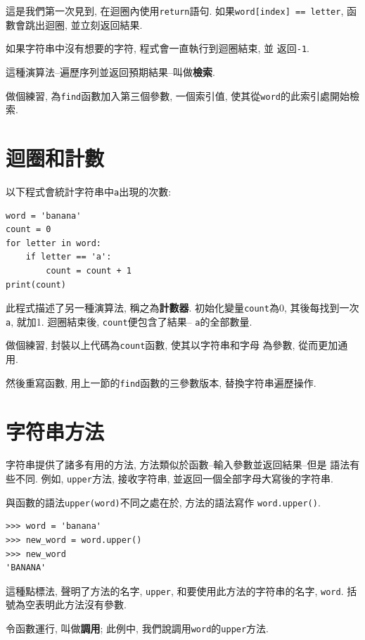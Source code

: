 \documentclass[10pt]{book}
\begin{document}
這是我們第一次見到, 在迴圈內使用{\tt return}語句. 
如果{\tt word[index] == letter}, 函數會跳出迴圈, 並立刻返回結果. 

如果字符串中沒有想要的字符, 程式會一直執行到迴圈結束, 並
返回{\tt -1}.

這種演算法--遍歷序列並返回預期結果--叫做{\bf 檢索}. 

做個練習, 為{\tt find}函數加入第三個參數, 一個索引值, 
使其從{\tt word}的此索引處開始檢索.


\section{迴圈和計數}
\label{counter}
以下程式會統計字符串中{\tt a}出現的次數:

\begin{verbatim}
word = 'banana'
count = 0
for letter in word:
    if letter == 'a':
        count = count + 1
print(count)
\end{verbatim}
%
此程式描述了另一種演算法, 稱之為{\bf 計數器}.
初始化變量{\tt count}為0, 其後每找到一次{\tt a}, 就加1.
迴圈結束後,  {\tt count}便包含了結果-- {\tt a}的全部數量.

做個練習, 封裝以上代碼為{\tt count}函數, 使其以字符串和字母
為參數, 從而更加通用. 

然後重寫函數, 用上一節的{\tt find}函數的三參數版本, 替換字符串遍歷操作. 


\section{字符串方法}
\label{optional}
字符串提供了諸多有用的方法, 方法類似於函數--輸入參數並返回結果--但是
語法有些不同. 
例如, {\tt upper}方法, 接收字符串, 
並返回一個全部字母大寫後的字符串. 

與函數的語法{\tt upper(word)}不同之處在於, 
方法的語法寫作 {\tt word.upper()}.

\begin{verbatim}
>>> word = 'banana'
>>> new_word = word.upper()
>>> new_word
'BANANA'
\end{verbatim}
%
這種點標法, 聲明了方法的名字, {\tt upper}, 
和要使用此方法的字符串的名字, {\tt word}. 
括號為空表明此方法沒有參數. 

令函數運行, 叫做{\bf 調用};
此例中, 我們說調用{\tt word}的{\tt upper}方法. 
\end{document}
